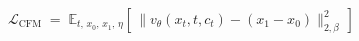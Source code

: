 \documentclass[border=10pt,varwidth=\maxdimen]{standalone}
\begin{document}
\(\displaystyle \mathcal{L}_{\mathrm{CFM}} \;=\; \mathbb{E}_{t,\,x_0,\,x_1,\,\eta}\!\left[\,\big\lVert v_\theta(x_t, t, c_t) - (x_1 - x_0) \big\rVert_{2,\beta}^2\,\right] \)
\end{document}
